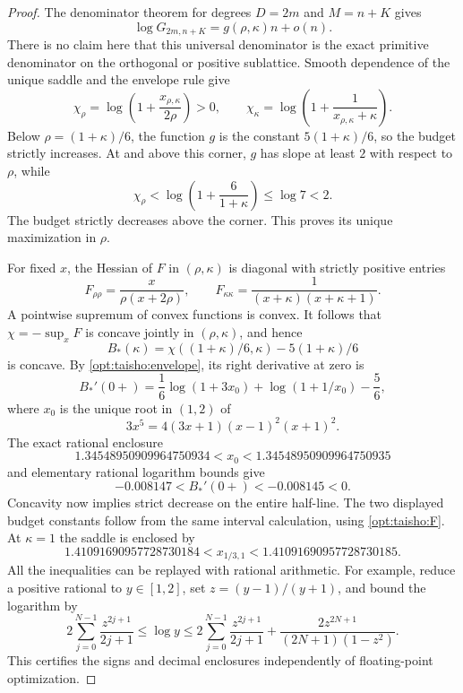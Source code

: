 \documentclass[11pt,a4paper]{article}
\numberwithin{equation}{section}
\theoremstyle{definition}\newtheorem{definition}[theorem]{Definition}
\theoremstyle{remark}\newtheorem{remark}[theorem]{Remark}
\begin{document}
\begin{proof}
The denominator theorem for degrees $D=2m$ and $M=n+K$ gives
\[
 \log G_{2m,n+K}=g(\rho,\kappa)n+o(n).
\]
There is no claim here that this universal denominator is the exact
primitive denominator on the orthogonal or positive sublattice.
Smooth dependence of the unique saddle and the envelope rule give
\begin{equation}\label{opt:taisho:envelope}
 \chi_\rho=\log\left(1+\frac{x_{\rho,\kappa}}{2\rho}\right)>0,
 \qquad
 \chi_\kappa=\log\left(1+\frac1{x_{\rho,\kappa}+\kappa}\right).
\end{equation}
Below $\rho=(1+\kappa)/6$, the function $g$ is the constant
$5(1+\kappa)/6$, so the budget strictly increases.
At and above this corner, $g$ has slope at least $2$ with respect to
$\rho$, while
\[
 \chi_\rho<\log\left(1+\frac{6}{1+\kappa}\right)
          \le\log7<2.
\]
The budget strictly decreases above the corner. This proves its unique
maximization in $\rho$.

For fixed $x$, the Hessian of $F$ in $(\rho,\kappa)$ is diagonal with
strictly positive entries
\[
 F_{\rho\rho}=\frac{x}{\rho(x+2\rho)},\qquad
 F_{\kappa\kappa}=\frac1{(x+\kappa)(x+\kappa+1)}.
\]
A pointwise supremum of convex functions is convex. It follows that
$\chi=-\sup_xF$ is concave jointly in $(\rho,\kappa)$, and hence
\[
 B_*(\kappa)=\chi\left((1+\kappa)/6,\kappa\right)
                   -5(1+\kappa)/6
\]
is concave. By \eqref{opt:taisho:envelope}, its right derivative at zero is
\begin{equation}\label{opt:taisho:derivative}
 B_*'(0+)=\frac16\log(1+3x_0)
             +\log(1+1/x_0)-\frac56,
\end{equation}
where $x_0$ is the unique root in $(1,2)$ of
\[
                  3x^5=4(3x+1)(x-1)^2(x+1)^2.
\]
The exact rational enclosure
\[
 1.34548950909964750934<x_0<1.34548950909964750935
\]
and elementary rational logarithm bounds give
\[
               -0.008147<B_*'(0+)<-0.008145<0.
\]
Concavity now implies strict decrease on the entire half-line.
The two displayed budget constants follow from the same interval
calculation, using \eqref{opt:taisho:F}. At $\kappa=1$ the saddle is enclosed by
\[
 1.41091690957728730184<x_{1/3,1}
                          <1.41091690957728730185.
\]
All the inequalities can be replayed with rational arithmetic. For
example, reduce a positive rational to $y\in[1,2]$, set
$z=(y-1)/(y+1)$, and bound the logarithm by
\[
 2\sum_{j=0}^{N-1}\frac{z^{2j+1}}{2j+1}
 \le\log y\le
 2\sum_{j=0}^{N-1}\frac{z^{2j+1}}{2j+1}
 +\frac{2z^{2N+1}}{(2N+1)(1-z^2)}.
\]
This certifies the signs and decimal enclosures independently of
floating-point optimization.
\end{proof}
\end{document}
